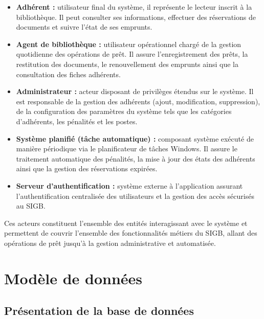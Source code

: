 \begin{itemize}
    \item \textbf{Adhérent :} utilisateur final du système, il représente le
    lecteur inscrit à la bibliothèque. Il peut consulter ses informations,
    effectuer des réservations de documents et suivre l'état de ses emprunts.
\newpage
    \item \textbf{Agent de bibliothèque :} utilisateur opérationnel chargé de
    la gestion quotidienne des opérations de prêt. Il assure l'enregistrement
    des prêts, la restitution des documents, le renouvellement des emprunts
    ainsi que la consultation des fiches adhérents.

    \item \textbf{Administrateur :} acteur disposant de privilèges étendus sur
    le système. Il est responsable de la gestion des adhérents (ajout,
    modification, suppression), de la configuration des paramètres du système
    tels que les catégories d'adhérents, les pénalités et les postes.

    \item \textbf{Système planifié (tâche automatique) :} composant système
    exécuté de manière périodique via le planificateur de tâches Windows. Il
    assure le traitement automatique des pénalités, la mise à jour des états
    des adhérents ainsi que la gestion des réservations expirées.

    \item \textbf{Serveur d'authentification :} système externe à l'application
    assurant l'authentification centralisée des utilisateurs et la gestion des
    accès sécurisés au SIGB.
\end{itemize}

Ces acteurs constituent l'ensemble des entités interagissant avec le système
et permettent de couvrir l'ensemble des fonctionnalités métiers du SIGB,
allant des opérations de prêt jusqu'à la gestion administrative et automatisée.

\section{Modèle de données}

\subsection{Présentation de la base de données}

